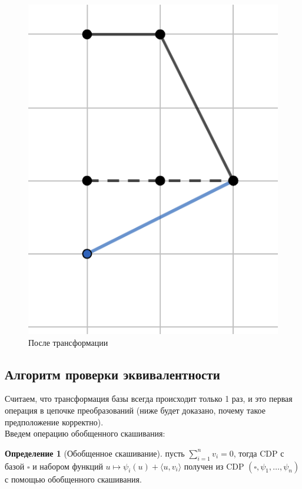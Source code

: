 \documentclass[fontsize=14pt]{scrartcl}
\theoremstyle{definition}
\newtheorem{definition}{Определение}[section]
\begin{document}
\begin{figure}[!htb]
  \includegraphics[width=\linewidth]{transformbase.png}
  \caption{После трансформации}\label{fig:awesome_image2}
\endminipage\hfill
\end{figure}


\subsection{Алгоритм проверки эквивалентности}
Считаем, что трансформация базы всегда происходит только 1 раз, и это первая операция в цепочке преобразований (ниже будет доказано, почему такое предположение корректно).
\\
Введем операцию обобщенного скашивания:

\begin{definition}[Обобщенное скашивание]
пусть $\sum_{i=1}^n v_i = 0$, тогда CDP с базой $\square$ и набором функций $u \mapsto \psi_i(u) + \langle u, v_i \rangle$ получен из CDP $(\square, \psi_1, \dots, \psi_n)$ с помощью обобщенного скашивания.
\end{definition}
\end{document}
